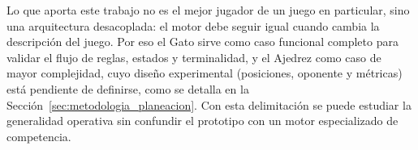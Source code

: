 Lo que aporta este trabajo no es el mejor jugador de un juego en particular, sino una arquitectura desacoplada: el motor debe seguir igual cuando cambia la descripción del juego. Por eso el Gato sirve como caso funcional completo para validar el flujo de reglas, estados y terminalidad, y el Ajedrez como caso de mayor complejidad, cuyo diseño experimental (posiciones, oponente y métricas) está pendiente de definirse, como se detalla en la Sección~\ref{sec:metodologia_planeacion}. Con esta delimitación se puede estudiar la generalidad operativa sin confundir el prototipo con un motor especializado de competencia.
